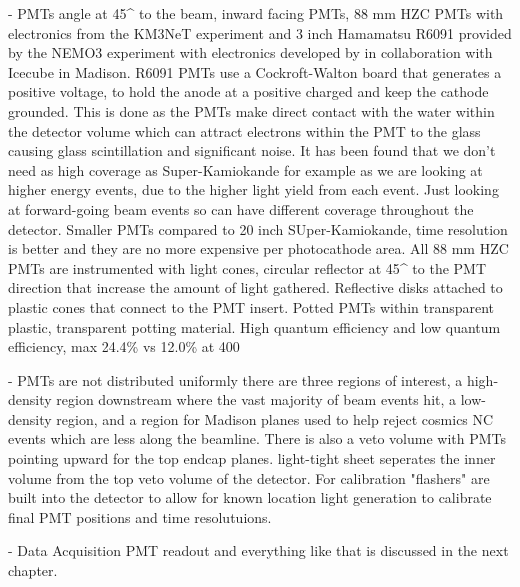 - PMTs angle at \unit{45}{^\circ} to the beam, inward facing PMTs, 88 mm HZC PMTs with electronics
from the KM3NeT experiment and 3 inch Hamamatsu R6091 provided by the NEMO3 experiment with
electronics developed by \chips in collaboration with Icecube in Madison. R6091 PMTs use a
Cockroft-Walton board that generates a positive voltage, to hold the anode at a positive charged
and keep the cathode grounded. This is done as the PMTs make direct contact with the water within
the detector volume which can attract electrons within the PMT to the glass causing glass
scintillation and significant noise. It has been found that we don't need as high coverage as
Super-Kamiokande for example as we are looking at higher energy events, due to the higher light
yield from each event. Just looking at forward-going beam events so can have different coverage
throughout the detector. Smaller PMTs compared to 20 inch SUper-Kamiokande, time resolution is
better and they are no more expensive per photocathode area. All 88 mm HZC PMTs are instrumented
with light cones, circular reflector at \unit{45}{^\circ} to the PMT direction that increase the
amount of light gathered. Reflective disks attached to plastic cones that connect to the PMT
insert. Potted PMTs within transparent plastic, transparent potting material. High quantum
efficiency and low quantum efficiency, max 24.4\% vs 12.0\% at \unit{400}{}

- PMTs are not distributed uniformly there are three regions of interest, a high-density region
downstream where the vast majority of beam events hit, a low-density region, and a region for
Madison planes used to help reject cosmics NC events which are less along the beamline. There is
also a veto volume with PMTs pointing upward for the top endcap planes. light-tight sheet
seperates the inner volume from the top veto volume of the detector. For calibration "flashers"
are built into the detector to allow for known location light generation to calibrate final PMT
positions and time resolutuions.

- Data Acquisition PMT readout and everything like that is discussed in the next chapter.

